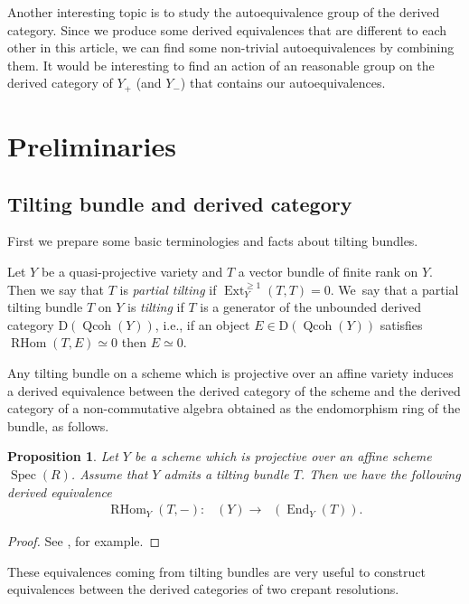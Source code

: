 \documentclass[10pt,a4paper]{amsart}
\DeclareMathOperator{\D}{D^b}
\DeclareMathOperator{\End}{End}
\DeclareMathOperator{\Ext}{Ext}
\DeclareMathOperator{\Qcoh}{Qcoh}
\DeclareMathOperator{\RHom}{RHom}
\DeclareMathOperator{\Spec}{Spec}
\numberwithin{equation}{section}
\newtheorem{Proposition}[Theorem]{Proposition}
 { \theoremstyle{definition}
\newtheorem{Definition}[Theorem]{Definition}
\newtheorem{Example}[Theorem]{Example}
\newtheorem{Remark}[Theorem]{Remark} }
\begin{document}
Another interesting topic is to study the autoequivalence group of the derived category.
Since we produce some derived equivalences that are different to each other in this article, we can find some non-trivial autoequivalences
by combining them.
It would be interesting to find an action of an reasonable group on the derived category of $Y_+$ (and $Y_-$)
that contains our autoequivalences.

\section{Preliminaries}

\subsection{Tilting bundle and derived category}

First we prepare some basic terminologies and facts about tilting bundles.

\begin{Definition}
Let $Y$ be a quasi-projective variety and $T$ a vector bundle of finite rank on $Y$.
Then we say that $T$ is \textit{partial tilting} if $\Ext_Y^{\geq 1}(T, T) = 0$.
We~say that a partial tilting bundle $T$ on $Y$ is \textit{tilting} if $T$ is a generator of the unbounded derived category $\mathrm{D}(\Qcoh(Y))$,
i.e., if an object $E \in \mathrm{D}(\Qcoh(Y))$ satisfies $\RHom(T,E) \simeq 0$ then $E \simeq 0$.
\end{Definition}

Any tilting bundle on a scheme which is projective over an affine variety
induces a derived equivalence between the derived category of the scheme and
the derived category of a non-commutative algebra obtained as the endomorphism ring of the bundle, as follows.

\begin{Proposition}
Let $Y$ be a scheme which is projective over an affine scheme $\Spec(R)$.
Assume that $Y$ admits a tilting bundle $T$.
Then we have the following derived equivalence
\begin{gather*}
\RHom_Y(T,-) \colon \ \D(Y) \to \D(\End_Y(T)).
\end{gather*}
\end{Proposition}

\begin{proof}
See \cite[Lemma 3.3]{TU10}, for example.
\end{proof}

These equivalences coming from tilting bundles are very useful to construct equivalences
between the derived categories of two crepant resolutions.
\end{document}
